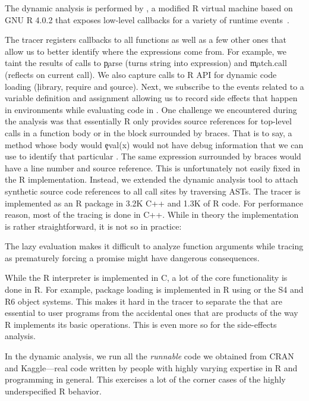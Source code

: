 \documentclass[review,screen,acmsmall,anonymous=true]{acmart}
\begin{document}
The dynamic analysis is performed by \rdyntrace, a modified R virtual machine
based on GNU R 4.0.2 that exposes low-level callbacks for a variety of runtime
events~\cite{oopsla19b}.

The tracer registers callbacks to all \eval functions as well as a few other
ones that allow us to better identify where the expressions come from. For
example, we taint the results of calls to \c{parse} (turns string into
expression) and \c{match.call} (reflects on current call). We also capture calls
to R API for dynamic code loading (\eg\xspace \c{library}, \c{require} and
\c{source}). Next, we subscribe to the events related to a variable definition
and assignment allowing us to record side effects that happen in environments
while evaluating code in \eval. One challenge we encountered during the analysis
was that essentially R only provides source references for top-level calls in a
function body or in the block surrounded by braces. That is to say, a method
whose body would \c{eval(x)} would not have debug information that we can use to
identify that particular \eval. The same expression surrounded by braces would
have a line number and source reference. This is unfortunately not easily fixed
in the R implementation. Instead, we extended the dynamic analysis tool to
attach synthetic source code references to all \eval call sites by traversing
ASTs. The tracer is implemented as an R package in 3.2K C++ and 1.3K of R code.
For performance reason, most of the tracing is done in C++. While in theory the
implementation is rather straightforward, it is not so in practice:
%
\begin{compactitem}[---]

\item The lazy evaluation makes it difficult to analyze function arguments
  while tracing as prematurely forcing a promise might have dangerous
  consequences.

\item While the R interpreter is implemented in C, a lot of the core
  functionality is done in R. For example, package loading is implemented in R
  using \eval or the S4 and R6 object systems. This makes it hard in the tracer
  to separate the \eval that are essential to user programs from the
  accidental ones that are products of the way R implements its basic
  operations. This is even more so for the side-effects analysis.

\item In the dynamic analysis, we run all the \emph{runnable} code we obtained
  from CRAN and Kaggle---\ie real code written by people with highly varying
  expertise in R and programming in general. This exercises a lot of the corner
  cases of the highly underspecified R behavior.

\end{compactitem}
\end{document}
